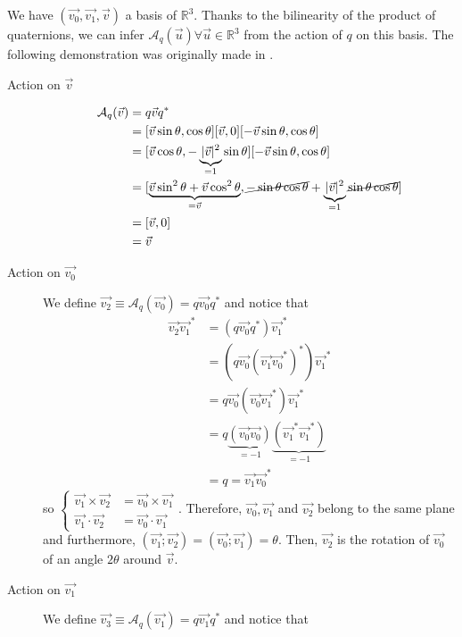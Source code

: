 \documentclass[class=report, float=false, crop=false]{standalone}
\begin{document}
We have $(\vec{v_0},\vec{v_1},\vec{v})$  a basis of $\mathbb{R}^3$. Thanks to the bilinearity of the product of quaternions, we can infer $\mathcal{A}_q(\vec{u}) \forall \vec{u} \in \mathbb{R}^3$ from the action of $q$ on this basis. The following demonstration was originally made in \cite{shoemake}.\\

\begin{description}
\item[Action on $\vec{v}$\hspace{20pt}]
\begin{align*}
\mathcal{A}_q(\vec{v}) &= q\vec{v}q^*\\
&= [\vec{v}\sin\theta,\cos\theta][\vec{v},0][-\vec{v}\sin\theta,\cos\theta]\\
&= [\vec{v}\cos\theta,-\underbrace{|\vec{v}|^2}_{=1}\sin\theta][-\vec{v}\sin\theta,\cos\theta]\\
&= [\underbrace{\vec{v}\sin^2\theta + \vec{v}\cos^2\theta}_{=\vec{v}},\cancel{-\sin\theta\cos\theta} + \underbrace{|\vec{v}|^2}_{=1}\cancel{\sin\theta\cos\theta}]\\
&= [\vec{v},0]\\
&= \vec{v}
\end{align*}
\item[Action on $\vec{v_0}$\hspace{20pt}] We define $\vec{v_2} \equiv \mathcal{A}_q(\vec{v_0}) = q\vec{v_0}q^*$ and notice that
\begin{align*}
\vec{v_2}\vec{v_1}^* &= (q\vec{v_0}q^*)\vec{v_1}^*\\
&= (q\vec{v_0}(\vec{v_1}\vec{v_0}^*)^*)\vec{v_1}^*\\
&= q\vec{v_0}(\vec{v_0}\vec{v_1}^*)\vec{v_1}^*\\
&=q\underbrace{(\vec{v_0}\vec{v_0})}_{=-1}\underbrace{(\vec{v_1}^*\vec{v_1}^*)}_{=-1}\\
&=q=\vec{v_1}\vec{v_0}^*
\end{align*}
so \(\begin{cases} \vec{v_1}\times\vec{v_2} &= \vec{v_0}\times\vec{v_1} \\ \vec{v_1}\cdot\vec{v_2} &= \vec{v_0} \cdot \vec{v_1} \end{cases} \). Therefore, $\vec{v_0}, \vec{v_1}$ and $\vec{v_2}$ belong to the same plane and furthermore, $(\vec{v_1};\vec{v_2}) = (\vec{v_0};\vec{v_1}) = \theta$. Then, $\vec{v_2}$ is the rotation of $\vec{v_0}$ of an angle $2\theta$ around $\vec{v}$.\\
\item[Action on $\vec{v_1}$\hspace{20pt}] We define $\vec{v_3} \equiv \mathcal{A}_q(\vec{v_1}) = q\vec{v_1}q^*$ and notice that

\end{description}
\end{document}
